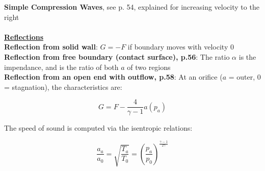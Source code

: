 \documentclass[8pt, landscape, fleqn]{scrartcl}
\begin{document}
\begin{multicols*}{3}
\textbf{Simple Compression Waves},
see p. 54, explained for increasing velocity to the right \\ \\ 
\underline{\textbf{Reflections}} \\
\textbf{Reflection from solid wall}: $G=-F$ if boundary moves with velocity $0$ \\

\textbf{Reflection from free boundary (contact surface), p.56}: The ratio $\alpha$ is the impendance, and is the ratio of both $a$ of two regions \\

\textbf{Reflection from an open end with outflow, p.58}: At an orifice ($a$ = outer, $0$ = stagnation), the characteristics are:

\begin{equation*}
    G = F - \frac{4}{\gamma-1} a(p_a)
\end{equation*}

The speed of sound is computed via the isentropic relations:

\begin{equation*}
    \frac{a_a}{a_0} = \sqrt{\frac{T_a}{T_0}} = \left( \frac{p_a}{p_0} \right)^{\frac{\gamma-1}{2\gamma}}
\end{equation*}

\end{multicols*}
\end{document}
